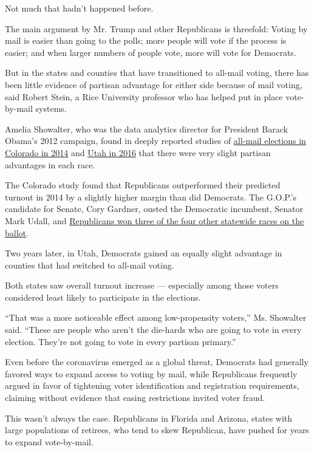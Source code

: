 Not much that hadn't happened before.

The main argument by Mr. Trump and other Republicans is threefold:
Voting by mail is easier than going to the polls; more people will vote
if the process is easier; and when larger numbers of people vote, more
will vote for Democrats.

But in the states and counties that have transitioned to all-mail
voting, there has been little evidence of partisan advantage for either
side because of mail voting, said Robert Stein, a Rice University
professor who has helped put in place vote-by-mail systems.

Amelia Showalter, who was the data analytics director for President
Barack Obama's 2012 campaign, found in deeply reported studies of
\href{https://www.voteathome.org/wp-content/uploads/2018/12/Colorado-2014-voter-turnout-study.pdf}{all-mail
elections in Colorado in 2014} and
\href{https://docs.wixstatic.com/ugd/ef45f5_fcc651c4d4f1456b8340bb4c2cc0ca12.pdf}{Utah
in 2016} that there were very slight partisan advantages in each race.

The Colorado study found that Republicans outperformed their predicted
turnout in 2014 by a slightly higher margin than did Democrats. The
G.O.P.'s candidate for Senate, Cory Gardner, ousted the Democratic
incumbent, Senator Mark Udall, and
\href{https://www.nytimes3xbfgragh.onion/elections/2014/colorado-elections}{Republicans
won three of the four other statewide races on the ballot}.

Two years later, in Utah, Democrats gained an equally slight advantage
in counties that had switched to all-mail voting.

Both states saw overall turnout increase --- especially among those
voters considered least likely to participate in the elections.

``That was a more noticeable effect among low-propensity voters,'' Ms.
Showalter said. ``These are people who aren't the die-hards who are
going to vote in every election. They're not going to vote in every
partisan primary.''

Even before the coronavirus emerged as a global threat, Democrats had
generally favored ways to expand access to voting by mail, while
Republicans frequently argued in favor of tightening voter
identification and registration requirements, claiming without evidence
that easing restrictions invited voter fraud.

This wasn't always the case. Republicans in Florida and Arizona, states
with large populations of retirees, who tend to skew Republican, have
pushed for years to expand vote-by-mail.

